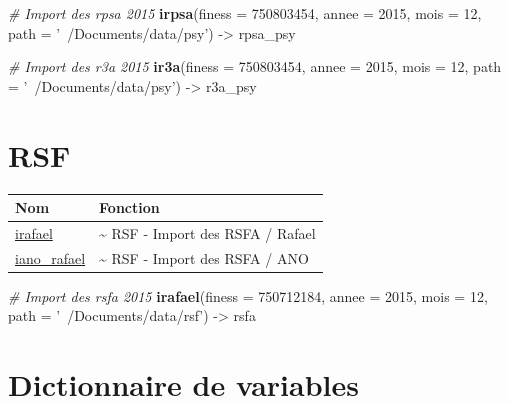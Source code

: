 \documentclass[]{book}
\newenvironment{Shaded}{\begin{snugshade}}{\end{snugshade}}
\newcommand{\KeywordTok}[1]{\textcolor[rgb]{0.13,0.29,0.53}{\textbf{{#1}}}}
\newcommand{\DataTypeTok}[1]{\textcolor[rgb]{0.13,0.29,0.53}{{#1}}}
\newcommand{\DecValTok}[1]{\textcolor[rgb]{0.00,0.00,0.81}{{#1}}}
\newcommand{\StringTok}[1]{\textcolor[rgb]{0.31,0.60,0.02}{{#1}}}
\newcommand{\CommentTok}[1]{\textcolor[rgb]{0.56,0.35,0.01}{\textit{{#1}}}}
\newcommand{\NormalTok}[1]{{#1}}
\begin{document}
\begin{Shaded}
\begin{Highlighting}[]
\CommentTok{# Import des rpsa 2015}
\KeywordTok{irpsa}\NormalTok{(}\DataTypeTok{finess =} \DecValTok{750803454}\NormalTok{,}
      \DataTypeTok{annee =} \DecValTok{2015}\NormalTok{,}
      \DataTypeTok{mois =} \DecValTok{12}\NormalTok{,}
      \DataTypeTok{path =} \StringTok{'~/Documents/data/psy'}\NormalTok{) ->}\StringTok{ }\NormalTok{rpsa_psy}

\CommentTok{# Import des r3a 2015}
\KeywordTok{ir3a}\NormalTok{(}\DataTypeTok{finess =} \DecValTok{750803454}\NormalTok{,}
      \DataTypeTok{annee =} \DecValTok{2015}\NormalTok{,}
      \DataTypeTok{mois =} \DecValTok{12}\NormalTok{,}
      \DataTypeTok{path =} \StringTok{'~/Documents/data/psy'}\NormalTok{) ->}\StringTok{ }\NormalTok{r3a_psy}
\end{Highlighting}
\end{Shaded}

\section{RSF}\label{rsf}

\begin{longtable}[]{@{}ll@{}}
\toprule
Nom & Fonction\tabularnewline
\midrule
\endhead
\href{https://github.com/IM-APHP/pmeasyr/tree/master/Rd_md/irafael.Rmd}{irafael}
& \textasciitilde{} RSF - Import des RSFA / Rafael\tabularnewline
\href{https://github.com/IM-APHP/pmeasyr/tree/master/Rd_md/iano_rafael.Rmd}{iano\_rafael}
& \textasciitilde{} RSF - Import des RSFA / ANO\tabularnewline
\bottomrule
\end{longtable}

\begin{Shaded}
\begin{Highlighting}[]
\CommentTok{# Import des rsfa 2015}
\KeywordTok{irafael}\NormalTok{(}\DataTypeTok{finess =} \DecValTok{750712184}\NormalTok{,}
        \DataTypeTok{annee =} \DecValTok{2015}\NormalTok{,}
        \DataTypeTok{mois =} \DecValTok{12}\NormalTok{,}
        \DataTypeTok{path =} \StringTok{'~/Documents/data/rsf'}\NormalTok{) ->}\StringTok{ }\NormalTok{rsfa}
\end{Highlighting}
\end{Shaded}

\section{Dictionnaire de variables}\label{dictionnaire-de-variables}
\end{document}

